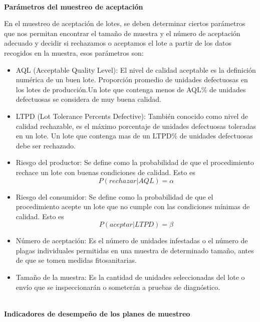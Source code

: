 ~\\\textbf{Par\'{a}metros del muestreo de aceptaci\'{o}n}

En el muestreo de aceptaci\'{o}n de lotes, se deben determinar ciertos par\'{a}metros que nos permitan encontrar el tama\~{n}o de muestra y el n\'{u}mero de aceptaci\'{o}n adecuado y decidir si rechazamos o aceptamos el lote a partir de los datos recogidos en la muestra, esos par\'{a}metros son:

\begin{itemize}
\item AQL (Acceptable Quality Level): El nivel de calidad aceptable es la definici\'{o}n num\'{e}rica de un buen lote. Proporci\'{o}n promedio de unidades defectuosas en los lotes de producci\'{o}n.Un lote que contenga menos de AQL\% de unidades defectuosas se considera de muy buena calidad.
\item LTPD (Lot Tolerance Percents Defective): Tambi\'{e}n conocido como nivel de calidad rechazable, es el m\'{a}ximo porcentaje de unidades defectuosas toleradas en un lote. Un lote que contenga mas de un LTPD\% de unidades defectuosas debe ser rechazado.
\item Riesgo del productor: Se define como la probabilidad de que el procedimiento rechace un lote con buenas condiciones de calidad. Esto es
$$P(rechazar|AQL)=\alpha$$
\item Riesgo del consumidor: Se define como la probabilidad de que el procedimiento acepte un lote que no cumple con las condiciones m\'{i}nimas de calidad. Esto es
$$P(aceptar|LTPD)=\beta$$
\item N\'{u}mero de aceptaci\'{o}n: Es el n\'{u}mero de unidades infestadas o el n\'{u}mero de plagas individuales permitidas en una
muestra de determinado tama\~{n}o, antes de que se tomen medidas fitosanitarias.\cite{MUES}

\item Tama\~{n}o de la muestra: Es la cantidad de unidades seleccionadas del lote o env\'{i}o que se inspeccionar\'{a}n o someter\'{a}n a
pruebas de diagn\'{o}stico.\cite{MUES}

\end{itemize}

~\\\textbf{Indicadores de desempe\~{n}o de los planes de muestreo}

